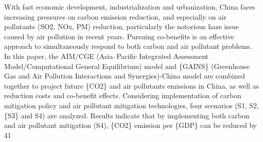 With fast economic development, industrialization and urbanization, China faces increasing pressures on carbon emission reduction, and especially on air pollutants (SO2, NOx, PM) reduction, particularly the notorious haze issue caused by air pollution in recent years. Pursuing co-benefits is an effective approach to simultaneously respond to both carbon and air pollutant problems. In this paper, the AIM/CGE (Asia–Pacific Integrated Assessment Model/Computational General Equilibrium) model and \{GAINS\} (Greenhouse Gas and Air Pollution Interactions and Synergies)-China model are combined together to project future \{CO2\} and air pollutants emissions in China, as well as reduction costs and co-benefit effects. Considering implementation of carbon mitigation policy and air pollutant mitigation technologies, four scenarios (S1, S2, \{S3\} and S4) are analyzed. Results indicate that by implementing both carbon and air pollutant mitigation (S4), \{CO2\} emission per \{GDP\} can be reduced by 41%